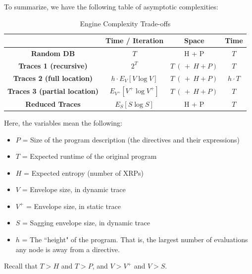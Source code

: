 \documentclass[10pt]{article}
\begin{document}
To summarize, we have the following table of asymptotic complexities:

\begin{table}[h]
\caption{Engine Complexity Trade-offs} \label{sample-table}
\begin{center}
\begin{tabular}{c|c | c |c } %
& {\bf  Time / Iteration} & {\bf Space} & {\bf Time} \\ \hline %
{\bf Random DB} & $T$ & H + P & $T$\\  %
{\bf Traces 1 (recursive)} & $2^T$ & $T \ (\, + \ H + P)$ & $T$ \\ %
{\bf Traces 2 (full location)} & $h \cdot E_V[V \log V]$ & $T \ (\, + \ H + P)$  & $h \cdot T$\\ %
{\bf Traces 3 (partial location)} & $E_{V^+}[V^+ \log V^+]$ & $T \ (\, + \ H + P)$ & $T$ \\ %
{\bf Reduced Traces} & $E_{S}[S \log S]$ & H + P& $T$\\ %
\end{tabular}
\end{center}
\end{table}

Here, the variables mean the following:
\begin{itemize}
\item $P$ = Size of the program description (the directives and their expressions)

\item $T$ = Expected runtime of the original program 

\item $H$ = Expected entropy (number of XRPs)

\item $V$ = Envelope size, in dynamic trace

\item $V^+$ = Envelope size, in static trace

\item $S$ = Sagging envelope size, in dynamic trace

\item $h$ = The ``height" of the program.  That is, the largest number of evaluations any node is away from a directive.
\end{itemize}

Recall that $T > H$ and $T > P$, and $V > V^+$ and $V > S$.  \\
\end{document}
